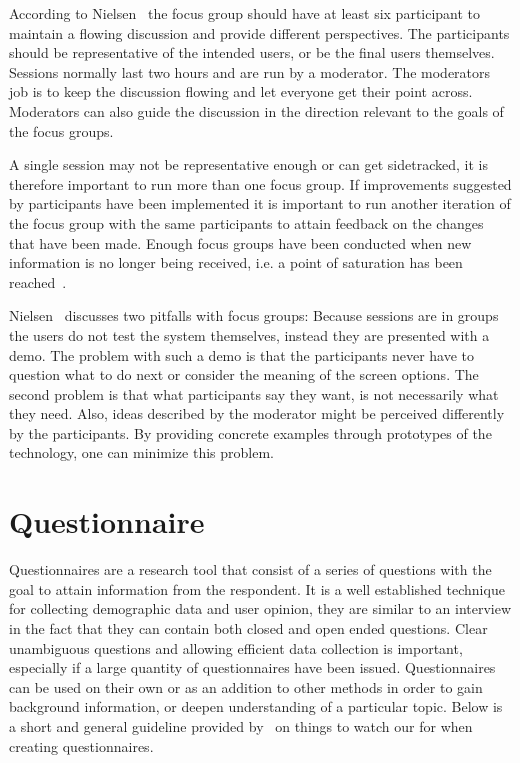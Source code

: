 According to Nielsen~\cite{focusGroup} the focus group should have at least six participant to maintain a flowing discussion and provide different perspectives. The participants should be representative of the intended users, or be the final users themselves. Sessions normally last two hours and are run by a moderator. The moderators job is to keep the discussion flowing and let everyone get their point across. Moderators can also guide the discussion in the direction relevant to the goals of the focus groups. 

A single session may not be representative enough or can get sidetracked, it is therefore important to run more than one focus group. If improvements suggested by participants have been implemented it is important to run another iteration of the focus group with the same participants to attain feedback on the changes that have been made. Enough focus groups have been conducted when new information is no longer being received, i.e. a point of saturation has been reached~\cite{howFocusGroup}. 

Nielsen~\cite{focusGroup} discusses two pitfalls with focus groups: Because sessions are in groups the users do not test the system themselves, instead they are presented with a demo. The problem with such a demo is that the participants never have to question what to do next or consider the meaning of the screen options. The second problem is that what participants say they want, is not necessarily what they need. Also, ideas described by the moderator might be perceived differently by the participants. By providing concrete examples through prototypes of the technology, one can minimize this problem.

\section{Questionnaire}
Questionnaires are a research tool that consist of a series of questions with the goal to attain information from the respondent. It is a well established technique for collecting demographic data and user opinion, they are similar to an interview in the fact that they can contain both closed and open ended questions. Clear unambiguous questions and allowing efficient data collection is important, especially if a large quantity of questionnaires have been issued. Questionnaires can be used on their own or as an addition to other methods in order to gain background information, or deepen understanding of a particular topic. Below is a short and general guideline provided by~\cite{interactionDesign} on things to watch our for when creating questionnaires.

